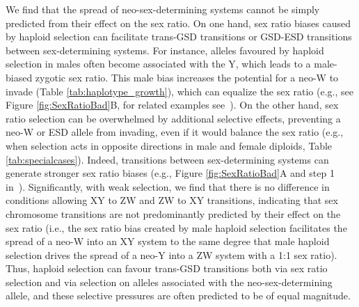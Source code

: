 \documentclass[10pt,letterpaper]{article}
\begin{document}
We find that the spread of neo-sex-determining systems cannot be simply predicted from their effect on the sex ratio. 
On one hand, sex ratio biases caused by haploid selection can facilitate trans-GSD transitions or GSD-ESD transitions between sex-determining systems. 
For instance, alleles favoured by haploid selection in males often become associated with the Y, which leads to a male-biased zygotic sex ratio.
This male bias increases the potential for a neo-W to invade (Table \ref{tab:haplotype_growth}), which can equalize the sex ratio (e.g., see Figure \ref{fig:SexRatioBad}B, for related examples see~\cite{Kozielska:2010vm}).
On the other hand, sex ratio selection can be overwhelmed by additional selective effects, preventing a neo-W or ESD allele from invading, even if it would balance the sex ratio (e.g., when selection acts in opposite directions in male and female diploids, Table \ref{tab:specialcases}). %
Indeed, transitions between sex-determining systems can generate stronger sex ratio biases (e.g., Figure \ref{fig:SexRatioBad}A and step 1 in~\cite{Ubeda:2015fx}).
Significantly, with weak selection, we find that there is no difference in conditions allowing XY to ZW and ZW to XY transitions, indicating that sex chromosome transitions are not predominantly predicted by their effect on the sex ratio (i.e., the sex ratio bias created by male haploid selection facilitates the spread of a neo-W into an XY system to the same degree that male haploid selection drives the spread of a neo-Y into a ZW system with a 1:1 sex ratio). 
Thus, haploid selection can favour trans-GSD transitions both via sex ratio selection and via selection on alleles associated with the neo-sex-determining allele, and these selective pressures are often predicted to be of equal magnitude. 
\end{document}
